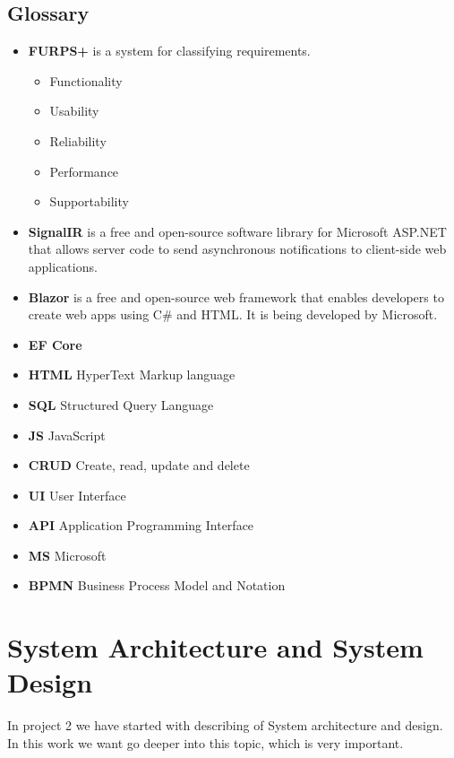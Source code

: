 \documentclass{scrartcl}
\begin{document}
\subsection{Glossary}
\begin{itemize}


\item \textbf{FURPS+}\cite{eeles2005capturing} is a system for classifying requirements.
\begin{itemize}
\item Functionality
\item Usability
\item Reliability
\item Performance
\item Supportability 
\end{itemize}


\item \textbf{ SignalIR} is a free and open-source software library for Microsoft ASP.NET that allows server code to send asynchronous notifications to client-side web applications. 

\item \textbf{Blazor} is a free and open-source web framework that enables developers to create web apps using C\# and HTML. It is being developed by Microsoft.

\item \textbf{EF Core} 

\item \textbf{HTML} HyperText Markup language


\item \textbf{SQL} Structured Query Language
\item \textbf{JS } JavaScript
\item \textbf{CRUD} Create, read, update and delete
\item \textbf{UI} User Interface
\item \textbf{API} Application Programming Interface 

\item \textbf{MS} Microsoft
\item \textbf{BPMN} Business Process Model and Notation



\end{itemize}


\section{System Architecture and System Design}
In project 2 we have started with describing of System architecture and design. In this work we want go deeper into this topic, which is very important. \\
\end{document}

